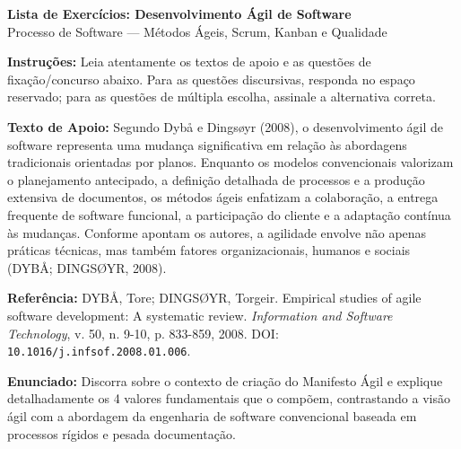 \documentclass[12pt]{article}
\begin{document}

\vspace*{0.2cm}

\begin{center}
  {\Large \textbf{Lista de Exercícios: Desenvolvimento Ágil de Software}}\\[0.2cm]
  {\normalsize Processo de Software --- Métodos Ágeis, Scrum, Kanban e Qualidade}
\end{center}

\vspace{0.2cm}

\textbf{Instruções:} Leia atentamente os textos de apoio e as questões de fixação/concurso abaixo. Para as questões discursivas, responda no espaço reservado; para as questões de múltipla escolha, assinale a alternativa correta.

\vspace{0.4cm}

\vspace{0.15cm}

\begin{textoApoio}
\small
\textbf{Texto de Apoio:} Segundo Dybå e Dingsøyr (2008), o desenvolvimento ágil de software representa uma mudança significativa em relação às abordagens tradicionais orientadas por planos. Enquanto os modelos convencionais valorizam o planejamento antecipado, a definição detalhada de processos e a produção extensiva de documentos, os métodos ágeis enfatizam a colaboração, a entrega frequente de software funcional, a participação do cliente e a adaptação contínua às mudanças. Conforme apontam os autores, a agilidade envolve não apenas práticas técnicas, mas também fatores organizacionais, humanos e sociais (DYBÅ; DINGSØYR, 2008).

\vspace{0.15cm}
\noindent\textbf{Referência:} DYBÅ, Tore; DINGSØYR, Torgeir. Empirical studies of agile software development: A systematic review. \textit{Information and Software Technology}, v. 50, n. 9-10, p. 833-859, 2008. DOI: \texttt{10.1016/j.infsof.2008.01.006}.
\end{textoApoio}

\vspace{0.15cm}
\noindent\textbf{Enunciado:} Discorra sobre o contexto de criação do Manifesto Ágil e explique detalhadamente os 4 valores fundamentais que o compõem, contrastando a visão ágil com a abordagem da engenharia de software convencional baseada em processos rígidos e pesada documentação.
\end{document}
